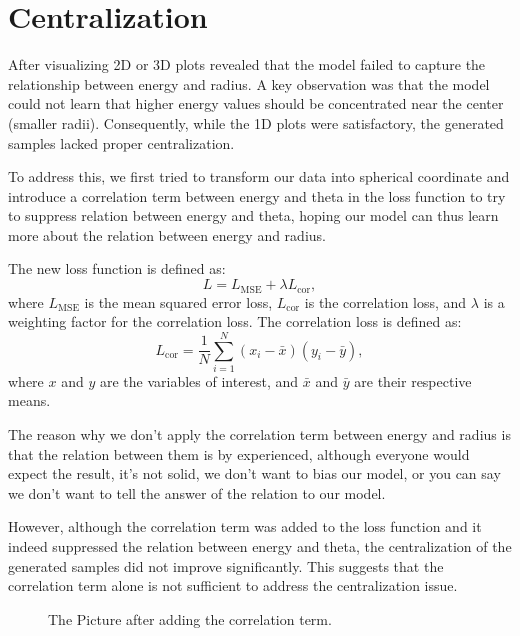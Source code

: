 \section{Centralization}
After visualizing 2D or 3D plots revealed that the model failed to capture the relationship between energy and radius. A key observation was that the model could not learn that higher energy values should be concentrated near the center (smaller radii). Consequently, while the 1D plots were satisfactory, the generated samples lacked proper centralization.

To address this, we first tried to transform our data into spherical coordinate and introduce a correlation term between energy and theta in the loss function to try to suppress relation between energy and theta, hoping our model can thus learn more about the relation between energy and radius. 

The new loss function is defined as:
\begin{equation}
    L = L_{\text{MSE}} + \lambda L_{\text{cor}},
\end{equation}
where $L_{\text{MSE}}$ is the mean squared error loss, $L_{\text{cor}}$ is the correlation loss, and $\lambda$ is a weighting factor for the correlation loss. The correlation loss is defined as:
\begin{equation}
    L_{\text{cor}} = \frac{1}{N} \sum_{i=1}^{N} (x_i - \bar{x})(y_i - \bar{y}),
\end{equation}
where $x$ and $y$ are the variables of interest, and $\bar{x}$ and $\bar{y}$ are their respective means.

The reason why we don't apply the correlation term between energy and radius is that the relation between them is by experienced, although everyone would expect the result, it's not solid, we don't want to bias our model, or you can say we don't want to tell the answer of the relation to our model. 

However, although the correlation term was added to the loss function and it indeed suppressed the relation between energy and theta, the centralization of the generated samples did not improve significantly. This suggests that the correlation term alone is not sufficient to address the centralization issue.

\begin{figure}[h!]
    \centering
    \caption{The Picture after adding the correlation term.}
\end{figure}

